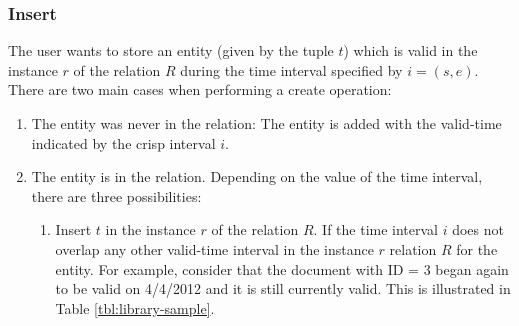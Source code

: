 \subsubsection{\label{subsubsec:insert}Insert}
The user wants to store an entity (given by the tuple $t$) which is valid in the instance $r$ of the relation $R$ during the time interval specified by $i = \left(s, e \right)$.
%
%
There are two main cases when performing a create operation:
\begin{enumerate}
\item The entity was never in the relation: The entity is added with the valid-time indicated by the crisp interval $i$. 


\item The entity is in the relation. Depending on the value of the time interval, there are three possibilities:
	\begin{enumerate}
	\item Insert $t$ in the instance $r$ of the relation $R$. If the time interval $i$ does not overlap any other valid-time interval in the instance $r$ relation $R$ for the entity. For example, consider that the document with ID = 3 began again to be valid on 4/4/2012 and it is still currently valid. This is illustrated in Table \ref{tbl:library-sample}.



\end{enumerate}
\end{enumerate}
